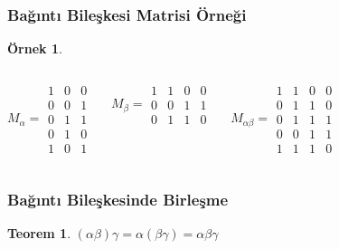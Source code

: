 \documentclass[dvipsnames]{beamer}
\theoremstyle{definition}
\theoremstyle{example}
\newtheorem{ornek}[theorem]{Örnek}
\theoremstyle{plain}
\newtheorem{teorem}[theorem]{Teorem}
\begin{document}
\begin{frame}
  \frametitle{Bağıntı Bileşkesi Matrisi Örneği}

  \begin{ornek}
    \begin{columns}
      \[ M_\alpha =
         \begin{array}{|ccc|}
           1 & 0 & 0\\
           0 & 0 & 1\\
           0 & 1 & 1\\
           0 & 1 & 0\\
           1 & 0 & 1
         \end{array}
      \]

      \[ M_\beta =
         \begin{array}{|cccc|}
           1 & 1 & 0 & 0\\
           0 & 0 & 1 & 1\\
           0 & 1 & 1 & 0
         \end{array}
      \]

      \[ M_{\alpha \beta} =
         \begin{array}{|cccc|}
           1 & 1 & 0 & 0\\
           0 & 1 & 1 & 0\\
           0 & 1 & 1 & 1\\
           0 & 0 & 1 & 1\\
           1 & 1 & 1 & 0
        \end{array}
      \]
    \end{columns}
  \end{ornek}
\end{frame}

\begin{frame}
  \frametitle{Bağıntı Bileşkesinde Birleşme}

  \begin{teorem}
      $(\alpha \beta) \gamma = \alpha (\beta \gamma) = \alpha \beta \gamma$
  \end{teorem}
\end{frame}
\end{document}
